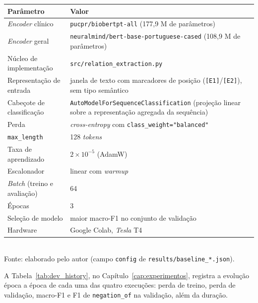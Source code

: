 \begin{quadro}[htbp]
  \centering
  \caption{Hiperparâmetros do ajuste fino, idênticos para os dois \emph{encoders}.}
  \label{quad:hp_encoders}
  \begin{tabular}{l p{7.2cm}}
  \toprule
  Parâmetro & Valor \\
  \midrule
  \emph{Encoder} clínico & \texttt{pucpr/biobertpt-all} (177,9 M de parâmetros) \\
  \emph{Encoder} geral & \texttt{neuralmind/\allowbreak bert-base-portuguese-cased} (108,9 M de parâmetros) \\
  Núcleo de implementação & \texttt{src/relation\_extraction.py} \\
  Representação de entrada & janela de texto com marcadores de posição (\texttt{[E1]}/\texttt{[E2]}), sem tipo semântico \\
  Cabeçote de classificação & \texttt{AutoModelForSequenceClassification} (projeção linear sobre a representação agregada da sequência) \\
  Perda & \emph{cross-entropy} com \texttt{class\_weight="balanced"} \\
  \texttt{max\_length} & 128 \emph{tokens} \\
  Taxa de aprendizado & $2\times10^{-5}$ (AdamW) \\
  Escalonador & linear com \emph{warmup} \\
  \emph{Batch} (treino e avaliação) & 64 \\
  Épocas & 3 \\
  Seleção de modelo & maior macro-F1 no conjunto de validação \\
  Hardware & Google Colab, \emph{Tesla} T4 \\
  \bottomrule
  \end{tabular}\\[4pt]
  {\footnotesize Fonte: elaborado pelo autor (campo \texttt{config} de \texttt{results/baseline\_*.json}).}
\end{quadro}

A Tabela~\ref{tab:dev_history}, no Capítulo~\ref{cap:experimentos}, registra a
evolução época a época de cada uma das quatro execuções: perda de treino, perda de
validação, macro-F1 e F1 de \texttt{negation\_of} na validação, além da duração.
